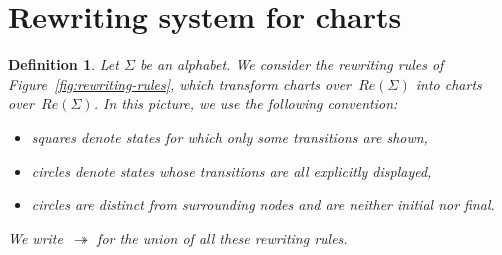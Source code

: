 \documentclass{article}
\newcommand{\damien}[1]{%
  \marginpar{\parbox{\marginparwidth}{\footnotesize\raggedright\color{red}dp: #1}}%
}
\newtheorem{definition}{Definition}[section]
\begin{document}
\section{Rewriting system for charts}

\begin{definition} Let $\Sigma$ be an alphabet. We consider the rewriting rules of Figure~\ref{fig:rewriting-rules}, 
  which transform charts over~$Re(\Sigma)$ into charts over~$Re(\Sigma)$. 
  In this picture, we use the following convention:
  \begin{itemize}
      \item squares denote states for which only some transitions are shown,
      \item circles denote states whose transitions are all explicitly displayed,
      \item circles are distinct from \damien{unclear} surrounding nodes and are neither initial nor final.
  \end{itemize}
  We write~$\twoheadrightarrow$ for the union of all these rewriting rules.\end{definition}
                      
\end{document}
